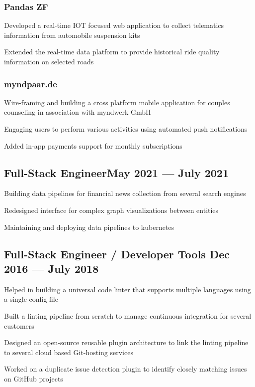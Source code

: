 \documentclass[letter,10pt]{article}
\begin{document}
\subsubsection*{Pandas ZF}
\begin{zitemize}
\item Developed a real-time IOT focused web application to collect telematics information from automobile suspension kits
\item Extended the real-time data platform to provide historical ride quality information on selected roads
\end{zitemize}

\subsubsection*{myndpaar.de}
\begin{zitemize}
\item Wire-framing and building a cross platform mobile application for couples counseling in association with myndwerk GmbH
\item Engaging users to perform various activities using automated push notifications
\item Added in-app payments support for monthly subscriptions
\end{zitemize}


\subsection{{Full-Stack Engineer\hfill May 2021 --- July 2021}}
\begin{zitemize}
\item Building data pipelines for financial news collection from several search engines
\item Redesigned interface for complex graph visualizations between entities
\item Maintaining and deploying data pipelines to kubernetes
\end{zitemize}


\subsection{{Full-Stack Engineer / Developer Tools \hfill Dec 2016 --- July 2018}}
\begin{zitemize}
\item Helped in building a universal code linter that supports multiple languages using a single config file
\item Built a linting pipeline from scratch to manage continuous integration for several customers
\item Designed an open-source reusable plugin architecture to link the linting pipeline to several cloud based Git-hosting services
\item Worked on a duplicate issue detection plugin to identify closely matching issues on GitHub projects
\end{zitemize}
\end{document}

